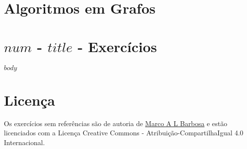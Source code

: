 \documentclass[a4paper,11pt]{article}
\begin{document}
\pagestyle{empty}

\section{Algoritmos em Grafos}

\section{$num$ - $title$ - Exercícios}

$body$

\section{Licença}

\begin{center}
Os exercícios sem referências são de autoria de \href{malbarbo.pro.br}{Marco A
L Barbosa} e estão licenciados com a Licença Creative Commons -
Atribuição-CompartilhaIgual 4.0 Internacional.

\href{http://creativecommons.org/licenses/by-sa/4.0/}{\ccbysa}
\end{center}
\end{document}
